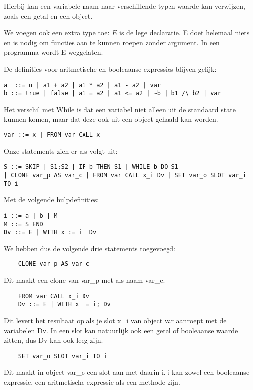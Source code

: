 \documentclass[12pt]{article}
\begin{document}
Hierbij kan een variabele-naam naar verschillende typen waarde kan verwijzen, zoals een getal en een object.

We voegen ook een extra type toe:
$E$ is de lege declaratie. E doet helemaal niets en is nodig om functies aan te kunnen roepen zonder argument.
In een programma wordt E weggelaten.


De definities voor aritmetische en booleaanse expressies blijven gelijk: 
\begin{lstlisting}
a  ::= n | a1 + a2 | a1 * a2 | a1 - a2 | var
b ::= true | false | a1 = a2 | a1 <= a2 | ~b | b1 /\ b2 | var 
\end{lstlisting}

Het verschil met While is dat een variabel niet alleen uit de standaard state kunnen komen, maar dat deze ook uit een object gehaald kan worden. 
\begin{lstlisting}
var ::= x | FROM var CALL x
\end{lstlisting}

Onze statements zien er als volgt uit: 
\begin{lstlisting}
S ::= SKIP | S1;S2 | IF b THEN S1 | WHILE b DO S1
| CLONE var_p AS var_c | FROM var CALL x_i Dv | SET var_o SLOT var_i TO i
\end{lstlisting}

Met de volgende hulpdefinities: 
\begin{lstlisting}
i ::= a | b | M
M ::= S END 
Dv ::= E | WITH x := i; Dv
\end{lstlisting}

We hebben dus de volgende drie statements toegevoegd: 
\begin{lstlisting}
	CLONE var_p AS var_c
\end{lstlisting} 
Dit maakt een clone van var\_p met als naam var\_c. 

\begin{lstlisting}
	FROM var CALL x_i Dv
	Dv ::= E | WITH x := i; Dv
\end{lstlisting}
Dit levert het resultaat op als je slot x\_i van object var aanroept met de variabelen Dv. In een slot kan natuurlijk ook een getal of booleaanse waarde zitten, dus Dv kan ook leeg zijn. 

\begin{lstlisting}
	SET var_o SLOT var_i TO i
\end{lstlisting} 
Dit maakt in object var\_o een slot aan met daarin i. i kan zowel een booleaanse expressie, een aritmetische expressie als een methode zijn. 
\end{document}
